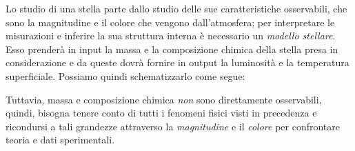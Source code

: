 Lo studio di una stella parte dallo studio delle sue caratteristiche osservabili, che sono la magnitudine e il colore che vengono dall'atmosfera; per interpretare le misurazioni e inferire la sua struttura interna è necessario un \emph{modello stellare}. Esso prenderà in input la massa e la composizione chimica della stella presa in considerazione e da queste dovrà fornire in output la luminosità e la temperatura superficiale. Possiamo quindi schematizzarlo come segue:
\begin{center}
\end{center}

Tuttavia, massa e composizione chimica \emph{non} sono direttamente osservabili, quindi, bisogna tenere conto di tutti i fenomeni fisici visti in precedenza e ricondursi a tali grandezze attraverso la \emph{magnitudine} e il \emph{colore} per confrontare teoria e dati sperimentali. 

